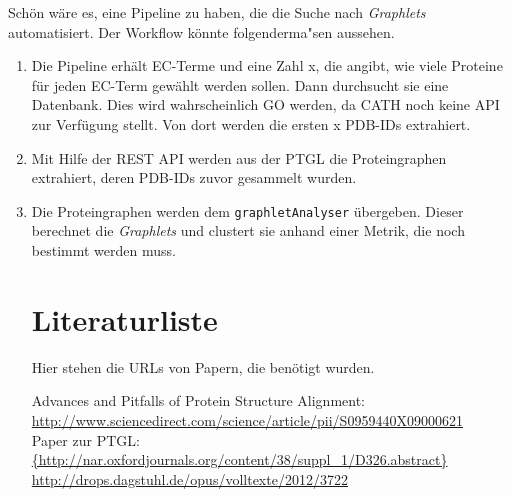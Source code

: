 \documentclass{article}
\begin{document}
Sch\"on w\"are es, eine Pipeline zu haben, die die Suche nach \textit{Graphlets} automatisiert. Der Workflow k\"onnte folgenderma"sen aussehen.
\begin{enumerate}

\item Die Pipeline erh\"alt EC-Terme und eine Zahl x, die angibt, wie viele Proteine für jeden EC-Term gew\"ahlt werden sollen. Dann durchsucht sie eine Datenbank. Dies wird wahrscheinlich GO werden, da CATH noch keine API zur Verf\"ugung stellt. Von dort werden die ersten x PDB-IDs extrahiert.

\item Mit Hilfe der REST API werden aus der PTGL die Proteingraphen extrahiert, deren PDB-IDs zuvor gesammelt wurden.

\item Die Proteingraphen werden dem \texttt{graphletAnalyser} \"ubergeben. Dieser berechnet die \textit{Graphlets} und clustert sie anhand einer Metrik, die noch bestimmt werden muss.

\section{Literaturliste}

Hier stehen die URLs von Papern, die ben\"otigt wurden.

Advances and Pitfalls of Protein Structure Alignment: \\
\url{http://www.sciencedirect.com/science/article/pii/S0959440X09000621} \\

Paper zur PTGL: \\
\url{{http://nar.oxfordjournals.org/content/38/suppl_1/D326.abstract}} \\
\url{http://drops.dagstuhl.de/opus/volltexte/2012/3722}

\end{enumerate}
\end{document}
